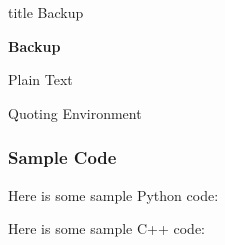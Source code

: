 \documentclass[aspectratio=1610]{beamer}
\begin{document}
\begin{NCARprettyframe}
  \begin{beamercolorbox}[sep=8pt,center]{title}
    \Huge{Backup}
  \end{beamercolorbox}
    \begin{exampleblock}{}
      \centering
      \textbf{Backup}
  \end{exampleblock}{}

\end{NCARprettyframe}



\begin{frame}{Plain Text}
  \lipsum[1]
\end{frame}



\begin{frame}{Quoting Environment}
  \lipsum[3]
  \begin{quote}
    \lipsum[4]
  \end{quote}
\end{frame}



\begin{frame}
  \frametitle{Sample Code}

  Here is some sample Python code:
  

  Here is some sample C++ code:
  
\end{frame}



\begin{frame}
  \vspace{3em}
  \hspace{1em}\layout{}
\end{frame}
\end{document}
